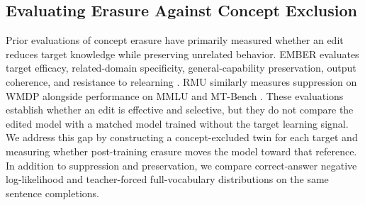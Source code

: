 \subsection{Evaluating Erasure Against Concept Exclusion}

Prior evaluations of concept erasure have primarily measured whether an edit
reduces target knowledge while preserving unrelated behavior. EMBER evaluates
target efficacy, related-domain specificity, general-capability preservation,
output coherence, and resistance to relearning \citep{suslik2026ember}. RMU
similarly measures suppression on WMDP alongside performance on MMLU and
MT-Bench \citep{li2024wmdp}. These evaluations establish whether an edit is
effective and selective, but they do not compare the edited model with a
matched model trained without the target learning signal. We address this gap
by constructing a concept-excluded twin for each target and measuring whether
post-training erasure moves the model toward that reference. In addition to
suppression and preservation, we compare correct-answer negative
log-likelihood and teacher-forced full-vocabulary distributions on the same
sentence completions.
